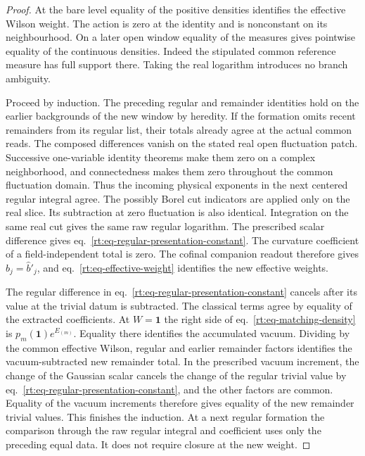 \documentclass[11pt,letterpaper,reqno]{amsart}
\numberwithin{equation}{section}
\renewcommand{\eqref}[1]{\textup{eq.~\ref{#1}}}
\theoremstyle{definition}
\theoremstyle{remark}
\begin{document}
\begin{proof}
At the bare level equality of the positive densities identifies the
effective Wilson weight. The action is zero at the identity and
is nonconstant on its neighbourhood. On a later open window equality
of the measures gives pointwise equality of the continuous densities.
Indeed the stipulated common reference measure has full support there. Taking the real
logarithm introduces no branch ambiguity.

Proceed by induction. The preceding regular and remainder identities
hold on the earlier backgrounds of the new window by heredity. If
the formation omits recent remainders from its regular list, their
totals already agree at the actual common reads. The composed differences vanish on the stated real open fluctuation
patch. Successive one-variable identity theorems make them zero
on a complex neighborhood, and connectedness makes them zero
throughout the common fluctuation domain. Thus the incoming
physical exponents in the next centered regular integral agree.
The possibly Borel cut indicators are applied only on the real slice. Its subtraction at zero fluctuation
is also identical. Integration on the same real cut gives the same
raw regular logarithm. The prescribed scalar difference gives
\eqref{rt:eq-regular-presentation-constant}. The curvature coefficient
of a field-independent total is zero. The cofinal companion readout
therefore gives $\widehat b_j=\widehat b'_j$, and
\eqref{rt:eq-effective-weight} identifies the new effective weights.

The regular difference in \eqref{rt:eq-regular-presentation-constant}
cancels after its value at the trivial datum is subtracted. The
classical terms agree by equality of the extracted coefficients.
At $W=\mathbf1$ the right side of \eqref{rt:eq-matching-density}
is $p_m(\mathbf1)e^{E_{(m)}}$. Equality there identifies the accumulated
vacuum. Dividing by the common effective Wilson, regular and
earlier remainder factors identifies the vacuum-subtracted new
remainder total. In the prescribed vacuum increment, the change of the
Gaussian scalar cancels the change of the regular trivial value
by \eqref{rt:eq-regular-presentation-constant}, and the other factors
are common. Equality of the vacuum increments therefore gives
equality of the new remainder trivial values. This finishes the
induction. At a next regular formation the comparison through the
raw regular integral and coefficient uses only the preceding equal
data. It does not require closure at the new weight.
\end{proof}
\end{document}
